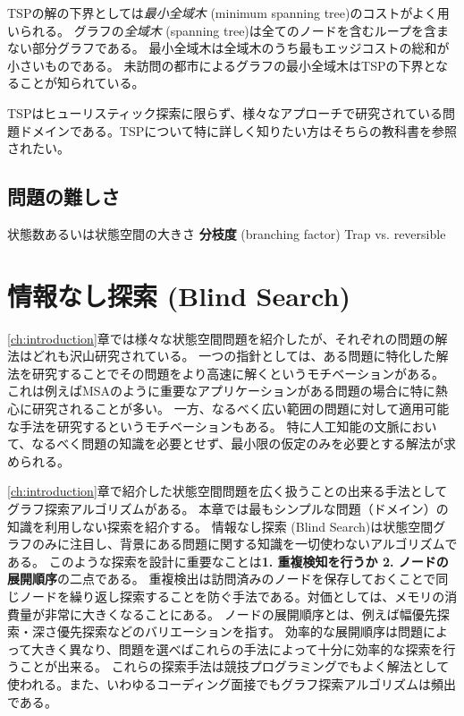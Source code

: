 \documentclass[b5paper]{report}
\newcommand{\define}[2]{{\bf #1} (#2) \index{#1}\index{#2}}
\begin{document}
TSPの解の下界としては{\it 最小全域木} (minimum spanning tree)のコストがよく用いられる\cite{held1970traveling}。
グラフの{\it 全域木} (spanning tree)は全てのノードを含むループを含まない部分グラフである。
最小全域木は全域木のうち最もエッジコストの総和が小さいものである。
未訪問の都市によるグラフの最小全域木はTSPの下界となることが知られている。

TSPはヒューリスティック探索に限らず、様々なアプローチで研究されている問題ドメインである\cite{applegate2006traveling}。TSPについて特に詳しく知りたい方はそちらの教科書を参照されたい。

\section{問題の難しさ}
\label{sec:difficulity}
状態数あるいは状態空間の大きさ
\define{分枝度}{branching factor}
Trap vs. reversible

\chapter{情報なし探索 (Blind Search)}
\label{ch:blind-search}

\ref{ch:introduction}章では様々な状態空間問題を紹介したが、それぞれの問題の解法はどれも沢山研究されている。
一つの指針としては、ある問題に特化した解法を研究することでその問題をより高速に解くというモチベーションがある。
これは例えばMSAのように重要なアプリケーションがある問題の場合に特に熱心に研究されることが多い。
一方、なるべく広い範囲の問題に対して適用可能な手法を研究するというモチベーションもある。
特に人工知能の文脈において、なるべく問題の知識を必要とせず、最小限の仮定のみを必要とする解法が求められる。

\ref{ch:introduction}章で紹介した状態空間問題を広く扱うことの出来る手法としてグラフ探索アルゴリズムがある。
本章では最もシンプルな問題（ドメイン）の知識を利用しない探索を紹介する。
情報なし探索 (Blind Search)は状態空間グラフのみに注目し、背景にある問題に関する知識を一切使わないアルゴリズムである。
このような探索を設計に重要なことは{\bf 1. 重複検知を行うか 2. ノードの展開順序}の二点である。
重複検出は訪問済みのノードを保存しておくことで同じノードを繰り返し探索することを防ぐ手法である。対価としては、メモリの消費量が非常に大きくなることにある。
ノードの展開順序とは、例えば幅優先探索・深さ優先探索などのバリエーションを指す。
効率的な展開順序は問題によって大きく異なり、問題を選べばこれらの手法によって十分に効率的な探索を行うことが出来る。
これらの探索手法は競技プログラミングでもよく解法として使われる\cite{skiena2006programming}。また、いわゆるコーディング面接でもグラフ探索アルゴリズムは頻出である\cite{mcdowell2011cracking}。
\end{document}
